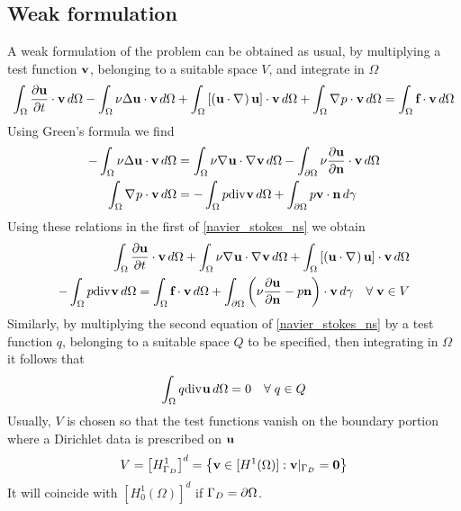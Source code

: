 \subsection{Weak formulation}
A weak formulation of the problem can be obtained as usual, by multiplying a test function \(\textbf{v}\), belonging to a suitable space \(V\), and integrate in \(\Omega\)
\begin{equation}
    \begin{split}
        \int_\Omega \partialderivative{\uvec}{t} \cdot \vvec \, d\Omega - \int_\Omega \nu \Delta \uvec \cdot \vvec \, d\Omega + \int_\Omega \left[ \left( \uvec \cdot \grad \right) \uvec \right] \cdot \vvec \, d\Omega + \int_\Omega \grad p \cdot \vvec \, d\Omega 
        = \int_\Omega \vect{f} \cdot \vvec \, d\Omega
    \end{split}
\end{equation}
Using Green's formula we find 
\begin{align*}
    -\int_\Omega \nu \Delta \uvec \cdot \vvec \, d\Omega &= \int_\Omega \nu \grad \uvec \cdot \grad \vvec \, d\Omega - \int_\boundary \nu \partialderivative{\uvec}{\normal} \cdot \vvec \, d\Omega \\
    \int_\Omega \grad p \cdot \vvec \, d\Omega &= - \int_\Omega p \div \vvec \, d\Omega + \int_\boundary p \vvec \cdot \normal \, d\gamma
\end{align*}
Using these relations in the first of \eqref{navier_stokes_ns} we obtain 
\begin{equation}
    \begin{split}
        \int_\Omega \partialderivative{\uvec}{t} \cdot \vvec \, d\Omega + \int_\Omega \nu \grad \uvec \cdot\grad \vvec \, d\Omega  + \int_\Omega \left[ \left( \uvec \cdot \grad \right) \uvec \right] \cdot \vvec \, d\Omega \\
        - \int_\Omega p\div \vvec \, d\Omega = \int_\Omega \vect{f} \cdot \vvec \, d\Omega + \int_\boundary \left( \nu \partialderivative{\uvec}{\normal} - p\normal \right) \cdot \vvec \, d\gamma \quad \forall \; \vvec \in V
    \end{split}
    \label{first_weak_formulation_ns}
\end{equation}
Similarly, by multiplying the second equation of \eqref{navier_stokes_ns} by a test function \(q\), belonging to a suitable space \(Q\) to be specified, then integrating in \(\Omega\) it follows that 
\begin{equation}
    \int_\Omega q \text{div}\mspace{1mu} \textbf{u} \, d\Omega = 0 \quad \forall \; q \in Q
    \label{weak_formulation_div_ns}
\end{equation}
Usually, \(V\) is chosen so that the test functions vanish on the boundary portion where a Dirichlet data is prescribed on \(\textbf{u}\)
\begin{equation}
    V = \left[ H^1_{\Gamma_D} \right]^d = \left\{ \textbf{v} \in [H^1(\Omega)] : \textbf{v}\vert_{\Gamma_D} = \textbf{0}\right\}
    \label{space_galerkin_ns}
\end{equation}
It will coincide with \(\left[ H^1_0(\Omega) \right]^d\) if \(\Gamma_D = {\partial\Omega}\). 

